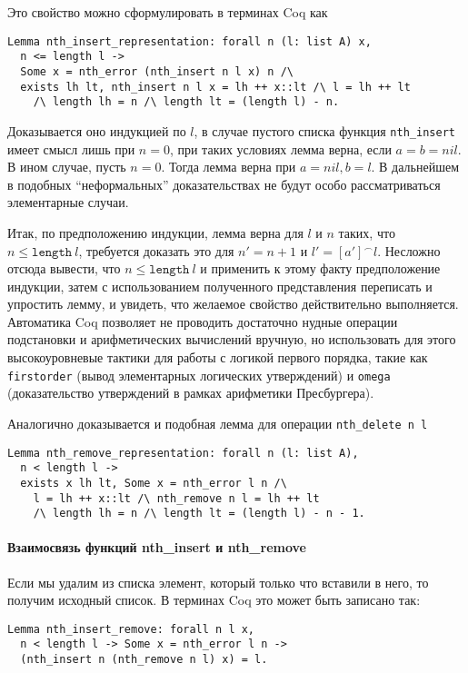 Это свойство можно сформулировать в терминах Coq как
\begin{Verbatim}[fontsize=\small]
Lemma nth_insert_representation: forall n (l: list A) x,
  n <= length l ->
  Some x = nth_error (nth_insert n l x) n /\
  exists lh lt, nth_insert n l x = lh ++ x::lt /\ l = lh ++ lt
    /\ length lh = n /\ length lt = (length l) - n.
 \end{Verbatim}

Доказывается оно индукцией по $l$, в случае пустого списка функция \texttt{nth\_insert} имеет смысл лишь при $n = 0$, при таких условиях лемма верна, если $a = b = nil$. В ином случае, пусть $n = 0$. Тогда лемма верна при $a = nil, b = l$. В дальнейшем в подобных ``неформальных''  доказательствах не будут особо рассматриваться элементарные случаи.

Итак, по предположению индукции, лемма верна для $l$ и $n$ таких, что $n \leq \texttt{length}\ l$, требуется доказать это для $n' = n + 1$ и $l' = [a']^\frown l$. Несложно отсюда вывести, что $n \leq \texttt{length}\ l$ и применить к этому факту предположение индукции, затем с использованием полученного представления переписать и упростить лемму, и увидеть, что желаемое свойство действительно выполняется. Автоматика Coq позволяет не проводить достаточно нудные операции подстановки и арифметических вычислений вручную, но использовать для этого высокоуровневые тактики для работы с логикой первого порядка, такие как \texttt{firstorder} (вывод элементарных логических утверждений) и \texttt{omega} (доказательство утверждений в рамках арифметики Пресбургера).

Аналогично доказывается и подобная лемма для операции \texttt{nth\_delete n l}
\begin{Verbatim}[fontsize=\small]
Lemma nth_remove_representation: forall n (l: list A),
  n < length l ->
  exists x lh lt, Some x = nth_error l n /\
    l = lh ++ x::lt /\ nth_remove n l = lh ++ lt
    /\ length lh = n /\ length lt = (length l) - n - 1.
\end{Verbatim}

\paragraph{Взаимосвязь функций nth\_insert и nth\_remove} Если мы удалим из списка элемент, который только что вставили в него, то получим исходный список. В терминах Coq это может быть записано так:
\begin{Verbatim}[fontsize=\small]
Lemma nth_insert_remove: forall n l x,
  n < length l -> Some x = nth_error l n ->
  (nth_insert n (nth_remove n l) x) = l.
\end{Verbatim}

